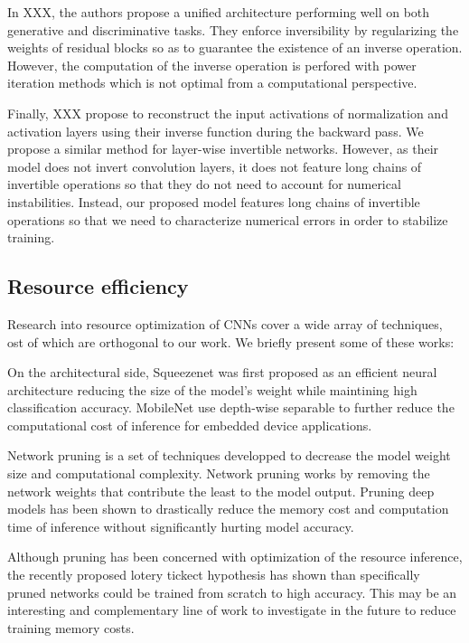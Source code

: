 \documentclass[twocolumn]{bmcart}
\begin{document}
In XXX, the authors propose a unified architecture performing well on both generative and discriminative tasks.
They enforce inversibility by regularizing the weights of residual blocks so as to guarantee the existence of an inverse operation.
However, the computation of the inverse operation is perfored with power iteration methods which is not optimal from a computational perspective.

Finally, XXX propose to reconstruct the input activations of normalization and activation layers using their inverse function during the backward pass.
We propose a similar method for layer-wise invertible networks. 
However, as their model does not invert convolution layers, 
it does not feature long chains of invertible operations so that they do not  need to account for numerical instabilities.
Instead, our proposed model features long chains of invertible operations so that we need to characterize numerical errors in order to stabilize training.

\subsection{Resource efficiency}

Research into resource optimization of CNNs cover a wide array of techniques, ost of which are orthogonal to our work. We briefly present some of these works:

On the architectural side, Squeezenet was first proposed as an efficient neural architecture reducing the size of the model's weight while maintining high classification accuracy.
MobileNet use depth-wise separable to further reduce the computational cost of inference for embedded device applications.

Network pruning is a set of techniques \cite{} developped to decrease the model weight size and computational complexity.
Network pruning works by removing the network weights that contribute the least to the model output.
Pruning deep models has been shown to drastically reduce the memory cost and computation time of inference without  significantly hurting model accuracy.

Although pruning has been concerned with optimization of the resource inference, the recently proposed lotery tickect hypothesis has shown than specifically pruned networks could  be trained from scratch to high accuracy. 
This may be an interesting and complementary line of work to investigate in the future to reduce training memory costs.
\end{document}
